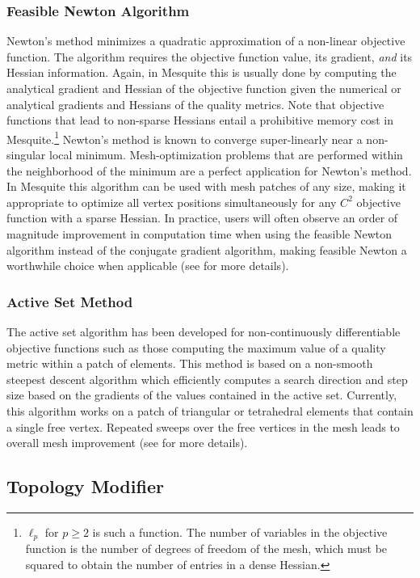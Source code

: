 \documentclass[letter]{report}
\begin{document}
\subsubsection{Feasible Newton Algorithm }
\label{append_feasnewt}
Newton's method minimizes a quadratic
approximation of a non-linear objective function. The algorithm requires
the objective function value, its gradient, \emph{and} its Hessian information.
Again, in Mesquite this
is usually done by computing the analytical gradient and Hessian of
the objective function given the numerical or analytical gradients and
Hessians of the quality metrics.  Note that objective functions that
lead to non-sparse Hessians entail a prohibitive memory cost in
Mesquite.\footnote{$\ell_p$ for $p \geq 2$ is such a function. The
number of variables in the objective function is the number of degrees
of freedom of the mesh, which must be squared to obtain the number of
entries in a dense Hessian.}  Newton's method is known to converge
super-linearly near a non-singular local minimum.   
Mesh-optimization problems that are performed within the neighborhood of
the minimum are a perfect application for Newton's method. In
Mesquite this algorithm can be used with mesh patches of any size,
making it appropriate to optimize all vertex positions simultaneously
for any $C^2$ objective function with a sparse Hessian.  In practice,
users will often observe an order of magnitude improvement in
computation time when using the feasible Newton algorithm instead of
the conjugate gradient algorithm, making feasible Newton a worthwhile
choice when applicable (see \cite{FeasNewt} for more details).

\subsubsection{Active Set Method }
\label{append_activeset}
The active set algorithm has been
developed for non-continuously differentiable objective functions such
as those computing the maximum value of a quality metric within a
patch of elements. This method is based on a non-smooth steepest
descent algorithm which efficiently computes a search direction and
step size based on the gradients of the values contained in the active
set.  Currently, this algorithm works on a patch of triangular or 
tetrahedral elements that 
contain a single free vertex.  Repeated
sweeps over the free vertices in the mesh leads to overall mesh
improvement (see \cite{fp:ijnme00} for more details).

\subsection{Topology Modifier}
\end{document}
